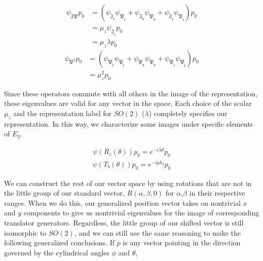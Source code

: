 \begin{equation}
\begin{aligned}
	\psi_{\mathfrak{JP}}p_0 &= (\psi_{\mathfrak{J_x}}\psi_{\mathfrak{P_x}} + \psi_{\mathfrak{J_y}}\psi_{\mathfrak{P_y}} + \psi_{\mathfrak{J_z}}\psi_{\mathfrak{P_z}})p_0 \\
							&= \mu_z \psi_{\mathfrak{J_z}}p_0 \\
							&= \mu_z\lambda p_0
\end{aligned}
\end{equation}
\begin{equation}
\begin{aligned}
	\psi_{\mathfrak{P}^2}p_0 &= (\psi_{\mathfrak{P_x}}\psi_{\mathfrak{P_x}} + \psi_{\mathfrak{P_y}}\psi_{\mathfrak{P_y}} + \psi_{\mathfrak{P_z}}\psi_{\mathfrak{P_z}})p_0 \\
							&= \mu_z^2p_0
\end{aligned}
\end{equation}

Since these operators commute with all others in the image of the representation, these eigenvalues are valid for any vector in the space. Each choice of the scalar $\mu_z$ and the representation label for $SO(2)$ ($\lambda$) completely specifies our representation. In this way, we characterize some images under specific elements of $E_3$.

\begin{equation}
\begin{aligned}
	\psi(R_z(\theta)) p_0 = e^{-i\lambda\theta}p_0
\end{aligned}
\end{equation}
\begin{equation}
\begin{aligned}
	\psi(T_b(\theta)) p_0 = e^{-i\mu b_3}p_0
\end{aligned}
\end{equation}

We can construct the rest of our vector space by using rotations that are not in the little group of our standard vector, $R(\alpha,\beta,0)$ for $\alpha$,$\beta$ in their respective ranges. When we do this, our generalized position vector takes on nontrivial $x$ and $y$ components to give us nontrivial eigenvalues for the image of corresponding translator generators. Regardless, the little group of our shifted vector is still isomorphic to $SO(2)$, and we can still use the same reasoning to make the following generalized conclusions. If $p$ is any vector pointing in the direction governed by the cylindrical angles $\phi$ and $\theta$,

